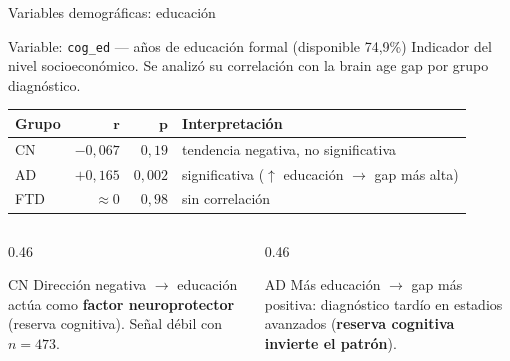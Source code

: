 \documentclass[aspectratio=169, 11pt]{beamer}
\begin{document}
\begin{frame}{Variables demográficas: educación}
  \begin{block}{Variable: \texttt{cog\_ed} — años de educación formal (disponible 74,9\%)}
    {\small Indicador del nivel socioeconómico. Se analizó su correlación con la brain age gap por grupo diagnóstico.}
  \end{block}

  \vspace{0.3cm}
  \centering
  {\small
  \begin{tabular}{lrrl}
    \toprule
    \textbf{Grupo} & $\boldsymbol{r}$ & $\boldsymbol{p}$ & \textbf{Interpretación} \\
    \midrule
    CN  & $-0{,}067$ & $0{,}19$ & tendencia negativa, no significativa \\
    AD  & $+0{,}165$ & $0{,}002$ & significativa ($\uparrow$ educación $\rightarrow$ gap más alta) \\
    FTD & $\approx 0$ & $0{,}98$ & sin correlación \\
    \bottomrule
  \end{tabular}}

  \vspace{0.35cm}
  \begin{columns}[T]
    \begin{column}{0.46\textwidth}
      \begin{block}{CN}
        {\small Dirección negativa $\rightarrow$ educación actúa como \textbf{factor neuroprotector} (reserva cognitiva). Señal débil con $n = 473$.}
      \end{block}
    \end{column}
    \begin{column}{0.46\textwidth}
      \begin{block}{AD}
        {\small Más educación $\rightarrow$ gap más positiva: diagnóstico tardío en estadios avanzados (\textbf{reserva cognitiva invierte el patrón}).}
      \end{block}
    \end{column}
  \end{columns}
\end{frame}
\end{document}
